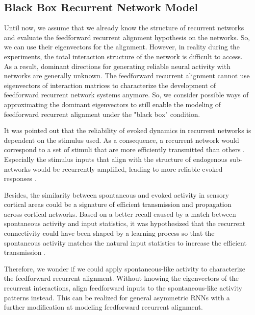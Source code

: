 \documentclass[11pt]{article}
\begin{document}
	\clearpage
	\subsection{Black Box Recurrent Network Model} \label{sec:black_box_method}
	Until now, we assume that we already know the structure of recurrent networks and evaluate the feedforward recurrent alignment hypothesis on the networks. So, we can use their eigenvectors for the alignment. However, in reality during the experiments, the total interaction structure of the network is difficult to access. 
	As a result, dominant directions for generating reliable neural activity with networks are generally unknown. The feedforward recurrent alignment cannot use eigenvectors of interaction matrices to characterize the development of feedforward recurrent network systems anymore. So, we consider possible ways of approximating the dominant eigenvectors to still enable the modeling of feedforward recurrent alignment under the "black box" condition.
	
	It was pointed out that the reliability of evoked dynamics in recurrent networks is dependent on the stimulus used. As a consequence, a recurrent network would correspond to a set of stimuli that are more efficiently transmitted than others \cite{marre2009reliable}. 
	Especially the stimulus inputs that align with the structure of endogenous sub-networks would be recurrently amplified, leading to more reliable evoked responses \cite{mulholland2023selective}. 
	
	Besides, the similarity between spontaneous and evoked activity in sensory cortical areas could be a signature of efficient transmission and propagation across cortical networks. Based on a better recall caused by a match between spontaneous activity and input statistics, it was hypothesized that the recurrent connectivity could have been shaped by a learning process so that the spontaneous activity matches the natural input statistics to increase the efficient transmission \cite{marre2009reliable}. 
	
	Therefore, we wonder if we could apply spontaneous-like activity to characterize the feedforward recurrent alignment. Without knowing the eigenvectors of the recurrent interactions, align feedforward inputs to the spontaneous-like activity patterns instead. This can be realized for general asymmetric RNNs with a further modification at modeling feedforward recurrent alignment. 
	
\end{document}

